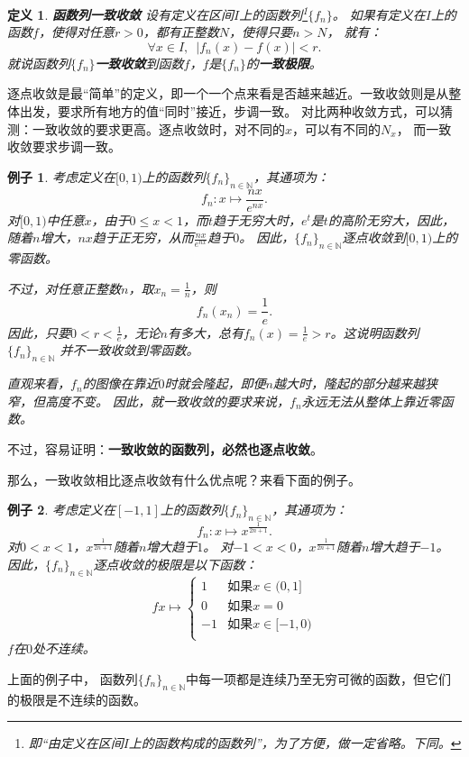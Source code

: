 \documentclass[12pt,UTF8]{ctexbook}
\newtheorem{df}{定义}[section]
\newtheorem{ex}{例子}[section]
\begin{document}
\begin{df}{\textbf{函数列一致收敛}}
    设有定义在区间$I$上的函数列\footnote{即“由定义在区间$I$上的函数构成的函数列”，为了方便，做一定省略。下同。}$\{f_n\}$。
    如果有定义在$I$上的函数$f$，使得对任意$r>0$，都有正整数$N$，使得只要$n>N$，
    就有：
    $$ \forall x\in I, \,\,\,|f_n(x) - f(x) | < r.$$
    就说函数列$\{f_n\}$\textbf{一致收敛}到函数$f$，$f$是$\{f_n\}$的\textbf{一致极限}。
\end{df}

逐点收敛是最“简单”的定义，即一个一个点来看是否越来越近。一致收敛则是从整体出发，要求所有地方的值“同时”接近，步调一致。
对比两种收敛方式，可以猜测：一致收敛的要求更高。逐点收敛时，对不同的$x$，可以有不同的$N_x$，
而一致收敛要求步调一致。

\begin{ex}
    考虑定义在$[0,1)$上的函数列$\{f_n\}_{n\in\mathbb{N}}$，其通项为：
    $$ f_n: x \mapsto \frac{nx}{e^{nx}}. $$
    对$[0,1)$中任意$x$，由于$0\leqslant x<1$，而$t$趋于无穷大时，$e^t$是$t$的高阶无穷大，因此，随着$n$增大，$nx$趋于正无穷，从而$\frac{nx}{e^{nx}}$趋于$0$。
    因此，$\{f_n\}_{n\in\mathbb{N}}$逐点收敛到$[0,1)$上的零函数。

    不过，对任意正整数$n$，取$x_n = \frac{1}{n}$，则
    $$f_n(x_n) = \frac{1}{e}.$$
    因此，只要$0<r <\frac{1}{e}$，无论$n$有多大，总有$f_n(x) = \frac{1}{e} > r$。这说明函数列$\{f_n\}_{n\in\mathbb{N}}$
    并不一致收敛到零函数。
    
    直观来看，$f_n$的图像在靠近$0$时就会隆起，即便$n$越大时，隆起的部分越来越狭窄，但高度不变。
    因此，就一致收敛的要求来说，$f_n$永远无法从整体上靠近零函数。

\end{ex}

不过，容易证明：\textbf{一致收敛的函数列，必然也逐点收敛}。

那么，一致收敛相比逐点收敛有什么优点呢？来看下面的例子。

\begin{ex}
    考虑定义在$[-1,1]$上的函数列$\{f_n\}_{n\in\mathbb{N}}$，其通项为：
    $$ f_n: x \mapsto x^{\frac{1}{2n+1}}. $$
    对$0<x<1$，$x^{\frac{1}{2n+1}}$随着$n$增大趋于$1$。
    对$-1<x<0$，$x^{\frac{1}{2n+1}}$随着$n$增大趋于$-1$。
    因此，$\{f_n\}_{n\in\mathbb{N}}$逐点收敛的极限是以下函数：
    $$
    f x\mapsto \left\{
        \begin{array}{ll}
            1 & \mbox{如果} x \in (0, 1] \\
            0 & \mbox{如果} x = 0 \\
            -1 & \mbox{如果} x \in [-1, 0) \\
        \end{array}
    \right.
    $$
    $f$在$0$处不连续。
\end{ex}
上面的例子中，
函数列$\{f_n\}_{n\in\mathbb{N}}$中每一项都是连续乃至无穷可微的函数，但它们的极限是不连续的函数。
\end{document}
